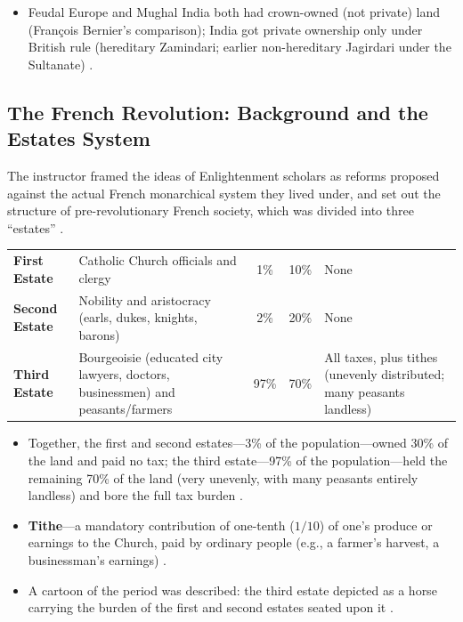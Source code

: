\begin{QuickRevision}
\begin{itemize}
    \item Feudal Europe and Mughal India both had crown-owned (not private) land (François Bernier's comparison); India got private ownership only under British rule (hereditary Zamindari; earlier non-hereditary Jagirdari under the Sultanate) .
\end{itemize}
\end{QuickRevision}

\subsection{The French Revolution: Background and the Estates System}
The instructor framed the ideas of Enlightenment scholars as reforms proposed against the actual French monarchical system they lived under, and set out the structure of pre-revolutionary French society, which was divided into three ``estates'' .

\vspace{6pt}
\noindent
\begin{tabularx}{\textwidth}{l p{4.2cm} c c Y}
\toprule
{}
 &  &  &  &  \\
\midrule
\textbf{First Estate} & Catholic Church officials and clergy & 1\% & 10\% & None  \\
\textbf{Second Estate} & Nobility and aristocracy (earls, dukes, knights, barons) & 2\% & 20\% & None  \\
\textbf{Third Estate} & Bourgeoisie (educated city lawyers, doctors, businessmen) and peasants/farmers & 97\% & 70\% & All taxes, plus tithes (unevenly distributed; many peasants landless)  \\
\bottomrule
\end{tabularx}
\vspace{6pt}

\begin{DataFact}
\begin{itemize}
    \item Together, the first and second estates---3\% of the population---owned 30\% of the land and paid no tax; the third estate---97\% of the population---held the remaining 70\% of the land (very unevenly, with many peasants entirely landless) and bore the full tax burden .
    \item \textbf{Tithe}---a mandatory contribution of one-tenth ($1/10$) of one's produce or earnings to the Church, paid by ordinary people (e.g., a farmer's harvest, a businessman's earnings) .
    \item A cartoon of the period was described: the third estate depicted as a horse carrying the burden of the first and second estates seated upon it .
\end{itemize}
\end{DataFact}

